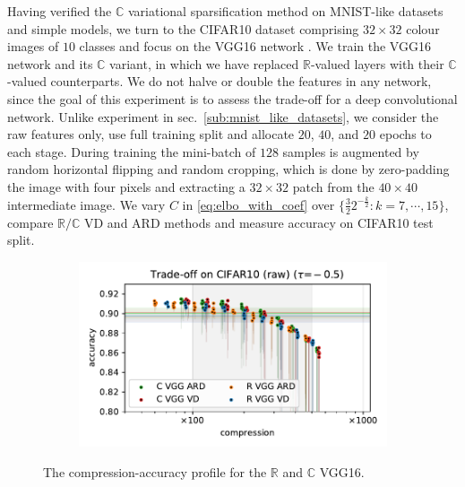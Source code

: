 \documentclass[a4paper,10pt,twocolumn]{article}
\newcommand{\real}{\mathbb{R}}
\newcommand{\cplx}{\mathbb{C}}
\begin{document}
Having verified the $\cplx$ variational sparsification method on MNIST-like datasets
and simple models, we turn to the CIFAR10 dataset comprising $32\times 32$ colour
images of $10$ classes \citep{krizhevsky_learning_2009} and focus on the VGG16 network
\citep{simonyan_very_2015}.
%
We train the VGG16 network and its $\cplx$ variant, in which we have replaced $\real$-valued
layers with their $\cplx$-valued counterparts. We do not halve or double the features
in any network, since the goal of this experiment is to assess the trade-off for a deep
convolutional network.
%
Unlike experiment in sec.~\ref{sub:mnist_like_datasets}, we consider the raw features
only, use full training split and allocate $20$, $40$, and $20$ epochs to each stage.
During training the mini-batch of $128$ samples is augmented by random horizontal flipping
and random cropping, which is done by zero-padding the image with four pixels and extracting
a $32\times 32$ patch from the $40\times 40$ intermediate image.
%
We vary $C$ in \eqref{eq:elbo_with_coef} over $
  \{\tfrac32 2^{-\tfrac{k}2} \colon k=7, \cdots, 15\}
$, compare $\real / \cplx$ VD and ARD methods and measure accuracy on CIFAR10 test split.

\begin{figure}[!t]
  \centering
  \begin{subfigure}[b]{1.\columnwidth}  %
    \includegraphics[width=\columnwidth]{figure__cifar__trade-off/appendix__augmentedcifar10__raw__-0.5.pdf}
  \end{subfigure}
  \caption{%
    The compression-accuracy profile for the $\real$ and $\cplx$ VGG16.
  }
  \label{fig:figure__cifar10__trade-off}
\end{figure}
\end{document}
